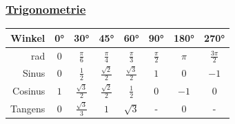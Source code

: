 \documentclass[6pt]{article}
\begin{document}
\begin{multicols*}{2}
\begin{multicols*}{3}
\end{multicols*}

\columnbreak
\subsubsection*{\underline{Trigonometrie}}
\begin{doublespace}
	\begin{tabular}{r | c c c c c c c}
		Winkel     &0°   &30°                    &45°                   &60°                   &90°              &180°   &270°               \\\hline 
		rad        &$0$  &$\frac{\pi}{6}$        &$\frac{\pi}{4}$       &$\frac{\pi}{3}$       &$\frac{\pi}{2}$  &$\pi$  &$\frac{3\pi}{2}$  \\\hline
		Sinus      &$0$  &$\frac{1}{2}$          &$\frac{\sqrt{2}}{2}$  &$\frac{\sqrt{3}}{2}$  &$1$              &$0$    &$-1$              \\
		Cosinus    &$1$  &$\frac{\sqrt{3}}{2}$   &$\frac{\sqrt{2}}{2}$  &$\frac{1}{2}$         &$0$              &$-1$   &$0$               \\
		Tangens    &$0$  &$\frac{\sqrt{3}}{3}$   &$1$                   &$\sqrt{3}$            &-                &$0$    &-                 \\
	\end{tabular}
\end{doublespace}



\end{multicols*}
\end{document}
